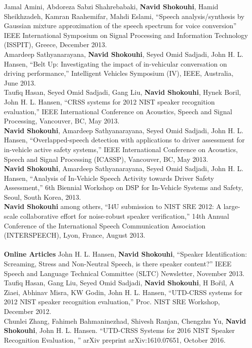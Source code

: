 \documentclass[doublespacing]{utdthesis}
\begin{document}
\begin{vita}
Jamal Amini, Abdoreza Sabzi Shahrebabaki, {\bf Navid Shokouhi}, Hamid Sheikhzadeh, Kamran Raahemifar, Mahdi Eslami,  ``Speech analysis/synthesis by Gaussian mixture approximation of the speech spectrum for voice conversion'' IEEE International Symposium on Signal Processing and Information Technology (ISSPIT), Greece, December 2013.\\

Amardeep Sathyanarayana, {\bf Navid Shokouhi}, Seyed Omid Sadjadi, John H. L. Hansen, ``Belt Up: Investigating the impact of in-vehicular conversation on driving performance,'' Intelligent Vehicles Symposium (IV), IEEE, Australia, June 2013. \\

Taufiq Hasan, Seyed Omid Sadjadi, Gang Liu, {\bf Navid Shokouhi}, Hynek Boril, John H. L. Hansen, ``CRSS systems for 2012 NIST speaker recognition evaluation,'' IEEE International Conference on Acoustics, Speech and Signal Processing, Vancouver, BC, May 2013. \\

{\bf Navid Shokouhi}, Amardeep Sathyanarayana, Seyed Omid Sadjadi, John H. L. Hansen, ``Overlapped-speech detection with applications to driver assessment for in-vehicle active safety systems,'' IEEE International Conference on Acoustics, Speech and Signal Processing (ICASSP), Vancouver, BC, May 2013. \\

{\bf Navid Shokouhi}, Amardeep Sathyanarayana, Seyed Omid Sadjadi, John H. L. Hansen, ``Analysis of In-Vehicle Speech Activity towards Driver Safety Assessment,'' 6th Biennial Workshop on DSP for In-Vehicle Systems and Safety, Seoul, South Korea, 2013.\\

{\bf Navid Shokouhi} among others, ``I4U submission to NIST SRE 2012: A large-scale collaborative effort for noise-robust speaker verification,'' 14th Annual Conference of the International Speech Communication Association (INTERSPEECH), Lyon, France, August 2013.\\\\

\textbf{\sc Online Articles}
John H. L. Hansen, {\bf Navid Shokouhi}, ``Speaker Identification: Screaming, Stress and Non-Neutral Speech, is there speaker content?'' IEEE Speech and Language Technical Committee (SLTC) Newsletter, November 2013.\\

Taufiq Hasan, Gang Liu, Seyed Omid Sadjadi, {\bf Navid Shokouhi}, H Bořil, A Ziaei, Abhinav Misra, KW Godin, John H. L. Hansen, ``UTD-CRSS systems for 2012 NIST speaker recognition evaluation,'' Proc. NIST SRE Workshop, December 2012. \\

Chunlei Zhang, Fahimeh Bahmaninezhad, Shivesh Ranjan, Chengzhu Yu, {\bf Navid Shokouhi}, John H. L. Hansen. ``UTD-CRSS Systems for 2016 NIST Speaker Recognition Evaluation, '' arXiv preprint arXiv:1610.07651, October 2016. 


\end{vita}
\end{document}
